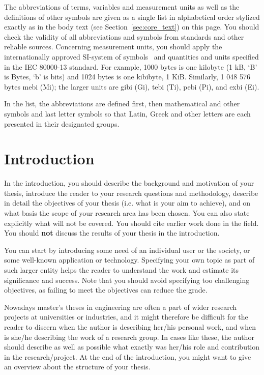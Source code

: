 The abbreviations of terms, variables and measurement units as well as
the definitions of other symbols are given as a single list in
alphabetical order stylized exactly as in the body text (see
Section~\ref{sec:core_text}) on this page. You should check the validity
of all abbreviations and symbols from standards and other reliable
sources. Concerning measurement units, you should apply the
internationally approved SI-system of symbols~\cite{siopas,
systemofunits} and quantities and units specified in the IEC 80000-13
standard. For example, 1000 bytes is one kilobyte (1 kB, `B' is Bytes,
`b' is bits) and 1024 bytes is one kibibyte, 1 KiB. Similarly, 1 048
576 bytes mebi (Mi); the larger units are gibi (Gi), tebi (Ti), pebi
(Pi), and exbi (Ei).

In the list, the abbreviations are defined first, then mathematical and other symbols and last letter symbols so that Latin, Greek and other letters are each presented in their designated groups. 

\section{Introduction}

In the introduction, you should describe the background and motivation of your thesis, introduce the reader to your research questions and methodology, describe in detail the objectives of your thesis (i.e. what is your aim to achieve), and on what basis the scope of your research area has been chosen. You can also state explicitly what will not be covered. You should cite earlier work done in the field. You should \textbf{not} discuss the results of your thesis in the introduction.

You can start by introducing some need of an individual user or the society, or some well-known application or technology. Specifying your own topic as part of such larger entity helps the reader to understand the work and estimate its significance and success. Note that you should avoid specifying too challenging objectives, as failing to meet the objectives can reduce the grade.

Nowadays master’s theses in engineering are often a part of wider research projects at universities or industries, and it might therefore be difficult for the reader to discern when the author is describing her/his personal work, and when is she/he describing the work of a research group. In cases like these, the author should describe as well as possible what exactly was her/his role and contribution in the research/project. At the end of the introduction, you might want to give an overview about the structure of your thesis.

